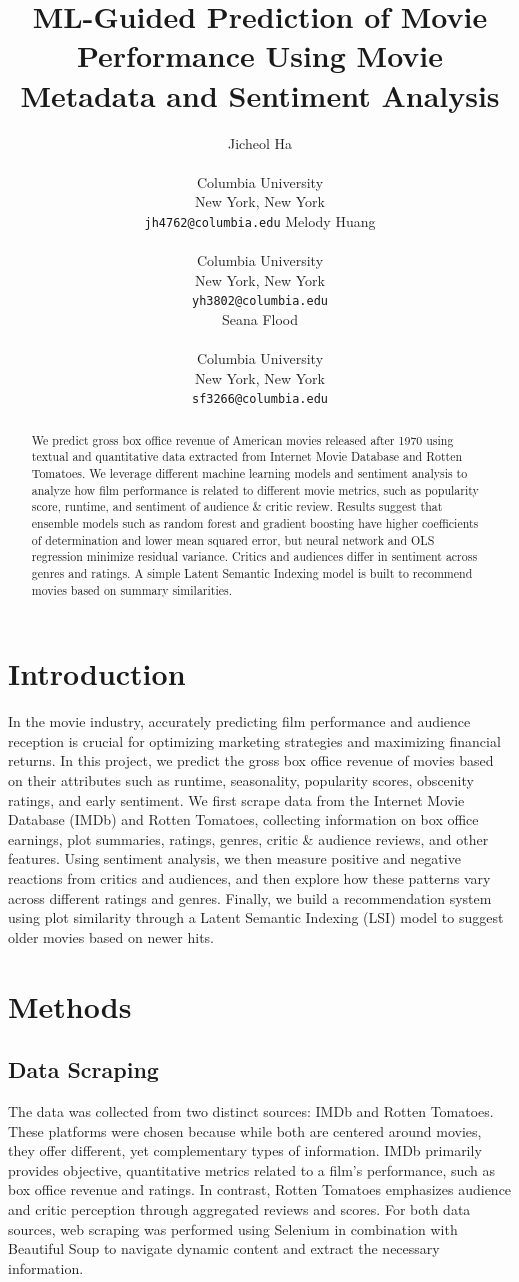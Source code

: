\documentclass{article}
\title{ML-Guided Prediction of Movie Performance Using Movie Metadata and Sentiment Analysis}
\author{
  Jicheol Ha \\
   \\
  Columbia University \\
  New York, New York\\
  \texttt{jh4762@columbia.edu}
    \And
  Melody Huang \\
   \\
  Columbia University \\
  New York, New York \\
  \texttt{yh3802@columbia.edu} \\
    \And
  Seana Flood \\
   \\
  Columbia University \\
  New York, New York \\
  \texttt{sf3266@columbia.edu} \\
}
\begin{document}
\maketitle
\vspace{-0.5cm}
\begin{abstract}
We predict gross box office revenue of American movies released after 1970 using textual and quantitative data extracted from Internet Movie Database and Rotten Tomatoes. We leverage different machine learning models and sentiment analysis to analyze how film performance is related to different movie metrics, such as popularity score, runtime,  and sentiment of audience \& critic review. Results suggest that ensemble models such as random forest and gradient boosting have higher coefficients of determination and lower mean squared error, but neural network and OLS regression minimize residual variance. Critics and audiences differ in sentiment across genres and ratings. A simple Latent Semantic Indexing model is built to recommend movies based on summary similarities. 
\end{abstract}


\section*{Introduction}
In the movie industry, accurately predicting film performance and audience reception is crucial for optimizing marketing strategies and maximizing financial returns. In this project, we predict the gross box office revenue of movies based on their attributes such as runtime, seasonality, popularity scores, obscenity ratings, and early sentiment. We first scrape data from the Internet Movie Database (IMDb) and Rotten Tomatoes, collecting information on box office earnings, plot summaries, ratings, genres, critic \& audience reviews, and other features. Using sentiment analysis, we then measure positive and negative reactions from critics and audiences, and then explore how these patterns vary across different ratings and genres. Finally, we build a recommendation system using plot similarity through a Latent Semantic Indexing (LSI) model to suggest older movies based on newer hits.

\section{Methods}
\subsection{Data Scraping}
The data was collected from two distinct sources: IMDb and Rotten Tomatoes. These platforms were chosen because while both are centered around movies, they offer different, yet complementary types of information. IMDb primarily provides objective, quantitative metrics related to a film’s performance, such as box office revenue and ratings. In contrast, Rotten Tomatoes emphasizes audience and critic perception through aggregated reviews and scores. For both data sources, web scraping was performed using Selenium in combination with Beautiful Soup to navigate dynamic content and extract the necessary information.
\end{document}
